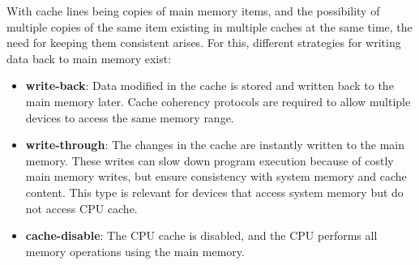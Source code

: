 
With cache lines being copies of main memory items, and the possibility of
multiple copies of the same item existing in multiple caches at the same time,
the need for keeping them consistent arises. For this, different strategies for
writing data back to main memory exist:
\begin{itemize}
  \item \textbf{write-back}: Data modified in the cache is stored and written
    back to the main memory later. Cache coherency protocols are required to
    allow multiple devices to access the same memory range.
  \item \textbf{write-through}: The changes in the cache are instantly written
    to the main memory. These writes can slow down program execution because of
    costly main memory writes, but ensure consistency with system memory and
    cache content. This type is relevant for devices that access system memory
    but do not access CPU cache.
  \item \textbf{cache-disable}: The CPU cache is disabled, and the CPU
    performs all memory operations using the main memory.
\end{itemize}

